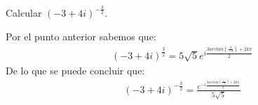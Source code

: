 \begin{homeworkProblem}
  Calcular $(-3+4i)^{-\frac{3}{2}}$.
  \begin{solution}
    Por el punto anterior sabemos que:
    \begin{align*}
      (-3+4i)^{\frac{3}{2}}=5\sqrt{5}e^{i\frac{3arctan\left( \frac{4}{-3} \right)+2k\pi}{2}}
    \end{align*}
    De lo que se puede concluir que:
    \begin{align*}
      (-3+4i)^{-\frac{3}{2}}=\frac{e^{-i\frac{3arctan\left( \frac{4}{-3} \right)+2k\pi}{2}}}{5\sqrt{5}}
    \end{align*}
  \end{solution}
\end{homeworkProblem}
